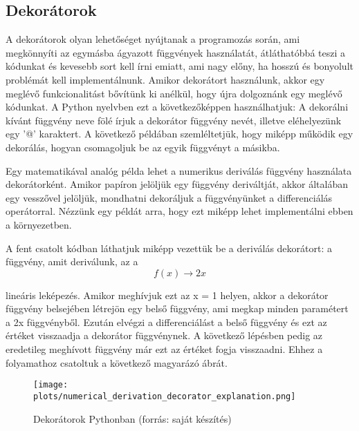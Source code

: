 \documentclass{article}
\theoremstyle{definition}
\theoremstyle{theorem}
\begin{document}
\subsection{Dekorátorok}
A dekorátorok olyan lehetőséget nyújtanak a programozás során, ami megkönnyíti az egymásba ágyazott függvények használatát, átláthatóbbá teszi a kódunkat és kevesebb sort kell írni emiatt, ami nagy előny, ha hosszú és bonyolult problémát kell implementálnunk. Amikor dekorátort használunk, akkor egy meglévő funkcionalitást bővítünk ki anélkül, hogy újra dolgoznánk egy meglévő kódunkat. A Python nyelvben ezt a következőképpen használhatjuk: A dekorálni kívánt függvény neve fölé írjuk a dekorátor függvény nevét, illetve eléhelyezünk egy '@' karaktert. A következő példában szemléltetjük, hogy miképp működik egy dekorálás, hogyan csomagoljuk be az egyik függvényt a másikba.

\pagebreak
Egy matematikával analóg példa lehet a numerikus deriválás függvény használata dekorátorként. Amikor papíron jelöljük egy függvény deriváltját, akkor általában egy vesszővel jelöljük, mondhatni dekoráljuk a függvényünket a differenciálás operátorral. Nézzünk egy példát arra, hogy ezt miképp lehet implementálni ebben a környezetben.

A fent csatolt kódban láthatjuk miképp vezettük be a deriválás dekorátort: a függvény, amit deriválunk, az a
\begin{equation*}
    f(x) \rightarrow 2x
\end{equation*}

lineáris leképezés. Amikor meghívjuk ezt az x = 1 helyen, akkor a dekorátor függvény belsejében létrejön egy belső függvény, ami megkap minden paramétert a 2x függvényből. Ezután elvégzi a differenciálást a belső függvény és ezt az értéket visszaadja a dekorátor függvénynek. A következő lépésben pedig az eredetileg meghívott függvény már ezt az értéket fogja visszaadni. Ehhez a folyamathoz csatoltuk a következő magyarázó ábrát. \newline
\begin{figure}[h!]
    \centering
    \texttt{[image: plots/numerical\_derivation\_decorator\_explanation.png]}
    \caption{Dekorátorok Pythonban (forrás: saját készítés)}
    \label{python_dekorator}
\end{figure}
\end{document}
